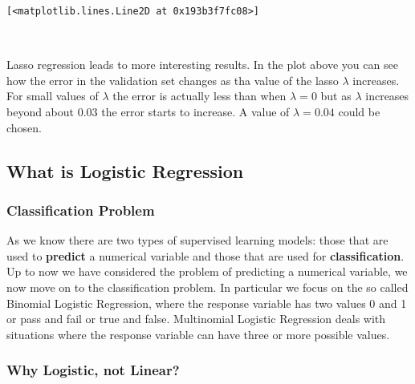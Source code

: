 \documentclass[11pt]{article}
\makeatletter
\newcommand{\boxspacing}{\kern\kvtcb@left@rule\kern\kvtcb@boxsep}
\newcommand{\prompt}[4]{
        {\ttfamily\llap{{\color{#2}[#3]:\hspace{3pt}#4}}\vspace{-\baselineskip}}
    }
\makeatother
\begin{document}
            \begin{tcolorbox}[breakable, size=fbox, boxrule=.5pt, pad at break*=1mm, opacityfill=0]
\prompt{Out}{outcolor}{25}{\boxspacing}
\begin{Verbatim}[commandchars=\\\{\}]
[<matplotlib.lines.Line2D at 0x193b3f7fc08>]
\end{Verbatim}
\end{tcolorbox}
        
    \begin{center}
    \end{center}
    { \hspace*{\fill} \\}
    
    Lasso regression leads to more interesting results. In the plot above
you can see how the error in the validation set changes as tha value of
the lasso \(\lambda\) increases. For small values of \(\lambda\) the
error is actually less than when \(\lambda = 0\) but as \(\lambda\)
increases beyond about \(0.03\) the error starts to increase. A value of
\(\lambda = 0.04\) could be chosen.

    \hypertarget{what-is-logistic-regression}{%
\subsection{What is Logistic
Regression}\label{what-is-logistic-regression}}

\hypertarget{classification-problem}{%
\subsubsection{Classification Problem}\label{classification-problem}}

As we know there are two types of supervised learning models: those that
are used to \textbf{predict} a numerical variable and those that are
used for \textbf{classification}. Up to now we have considered the
problem of predicting a numerical variable, we now move on to the
classification problem. In particular we focus on the so called Binomial
Logistic Regression, where the response variable has two values 0 and 1
or pass and fail or true and false. Multinomial Logistic Regression
deals with situations where the response variable can have three or more
possible values.

\hypertarget{why-logistic-not-linear}{%
\subsubsection{Why Logistic, not
Linear?}\label{why-logistic-not-linear}}
\end{document}
